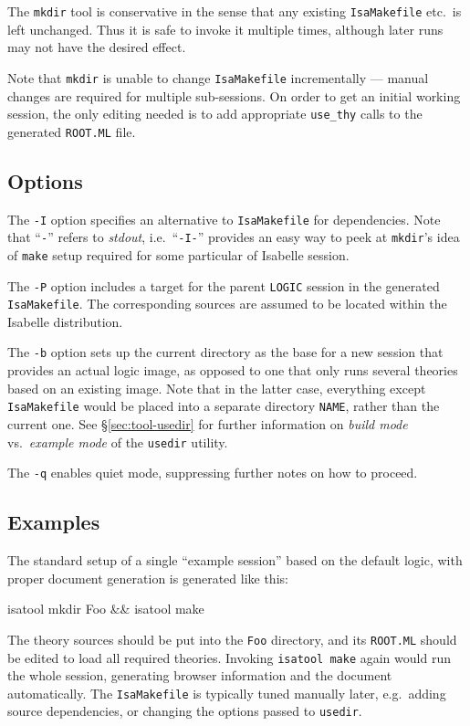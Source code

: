 The \texttt{mkdir} tool is conservative in the sense that any existing
\texttt{IsaMakefile} etc.\ is left unchanged.  Thus it is safe to invoke it
multiple times, although later runs may not have the desired effect.

Note that \texttt{mkdir} is unable to change \texttt{IsaMakefile}
incrementally --- manual changes are required for multiple sub-sessions.  On
order to get an initial working session, the only editing needed is to add
appropriate \texttt{use_thy} calls to the generated \texttt{ROOT.ML} file.


\subsection*{Options}

The \texttt{-I} option specifies an alternative to \texttt{IsaMakefile} for
dependencies.  Note that ``\texttt{-}'' refers to \emph{stdout}, i.e.\ 
``\texttt{-I-}'' provides an easy way to peek at \texttt{mkdir}'s idea of
\texttt{make} setup required for some particular of Isabelle session.

\medskip The \texttt{-P} option includes a target for the parent
\texttt{LOGIC} session in the generated \texttt{IsaMakefile}.  The
corresponding sources are assumed to be located within the Isabelle
distribution.

\medskip The \texttt{-b} option sets up the current directory as the base for
a new session that provides an actual logic image, as opposed to one that only
runs several theories based on an existing image.  Note that in the latter
case, everything except \texttt{IsaMakefile} would be placed into a separate
directory \texttt{NAME}, rather than the current one.  See
\S\ref{sec:tool-usedir} for further information on \emph{build mode} vs.\ 
\emph{example mode} of the \texttt{usedir} utility.

\medskip The \texttt{-q} enables quiet mode, suppressing further notes on how
to proceed.


\subsection*{Examples}

The standard setup of a single ``example session'' based on the default logic,
with proper document generation is generated like this:
\begin{ttbox}
isatool mkdir Foo && isatool make
\end{ttbox}
\noindent The theory sources should be put into the \texttt{Foo} directory, and its
\texttt{ROOT.ML} should be edited to load all required theories.  Invoking
\texttt{isatool make} again would run the whole session, generating browser
information and the document automatically.  The \texttt{IsaMakefile} is
typically tuned manually later, e.g.\ adding source dependencies, or changing
the options passed to \texttt{usedir}.

